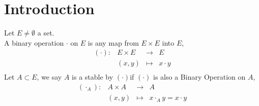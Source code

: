 \chapter{Introduction}
Let $E \neq \emptyset  $ a set. \\
A binary operation $\cdot  $ on $E $ is any map from 
$E \times E  $ into $E $,
\[
\begin{array}{cccc}
  ( \cdot )  : &  E \times E   & \longrightarrow & E \\

           &  (x,y)   & \longmapsto     & x \cdot y \\ 
\end{array}
\]
Let $A \subset E $, we say $A $ is a stable by $(\cdot)  $if $(\cdot)$ is also a Binary Operation 
on $A$,
\[
\begin{array}{cccc}
  (\cdot _{A}) : &  A \times A   & \longrightarrow & A \\

           &  (x, y)   & \longmapsto     &  x \cdot _{A} y = x \cdot y\\ 
\end{array}
\]

